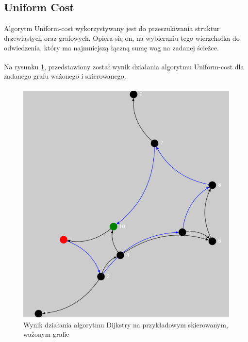 \subsection{Uniform Cost}
\paragraph{}
Algorytm Uniform-cost wykorzystywany jest do przeszukiwania struktur drzewiastych oraz grafowych.
Opiera się on, na wybieraniu tego wierzchołka do odwiedzenia, który ma najmniejszą łączną sumę wag na zadanej ścieżce.

\paragraph{}
Na rysunku \ref{fig:uniformCost}, przedstawiony został wynik działania algorytmu Uniform-cost dla zadanego grafu ważonego i skierowanego.

\paragraph{}
\begin{figure}[!h]
 \centering
 \includegraphics{algorithms/uniformCost}
 \caption{Wynik działania algorytmu Dijkstry na przykładowym skierowanym, ważonym grafie}
 \label{fig:uniformCost}
\end{figure}


